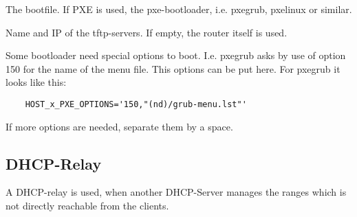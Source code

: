   \begin{description}


    The bootfile. If PXE is used, the pxe-bootloader, i.e. pxegrub, pxelinux
    or similar.

    Name and IP of the tftp-servers. If empty, the router itself is used.


    Some bootloader need special options to boot. I.e. pxegrub asks by use of option
    150 for the name of the menu file. This options can be put here. For pxegrub it looks
    like this:\\
    \begin{example}
      \begin{verbatim}
	HOST_x_PXE_OPTIONS='150,"(nd)/grub-menu.lst"'
      \end{verbatim}
    \end{example}

    If more options are needed, separate them by a space.
  \end{description}

\subsection {DHCP-Relay}

A DHCP-relay is used, when another DHCP-Server manages the ranges which is
not directly reachable from the clients.

